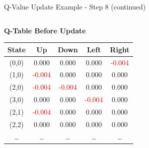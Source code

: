 \documentclass[aspectratio=169]{beamer}
\begin{document}
\begin{frame}{Q-Value Update Example - Step 8 (continued)}

    \begin{columns}
        
        \begin{column}{0.5\textwidth}
            \textbf{Q-Table Before Update}
            \small
            \begin{table}[h]
                \centering
                \begin{tabular}{|c|c|c|c|c|}
                    \hline
                    \textbf{State} & \textbf{Up} & \textbf{Down} & \textbf{Left} & \textbf{Right} \\
                    \hline
                    (0,0) & 0.000 & 0.000 & 0.000 & \textcolor{red}{-0.004} \\
                    (1,0) & \textcolor{red}{-0.004} & 0.000 & 0.000 & 0.000 \\
                    (2,0) & \textcolor{red}{-0.004} & \textcolor{red}{-0.004} & 0.000 & 0.000 \\
                    (3,0) & 0.000 & 0.000 & \textcolor{red}{-0.004} & 0.000 \\
                    (2,1) & \textcolor{red}{-0.004} & 0.000 & 0.000 & 0.000 \\
                    (2,2) & 0.000 & 0.000 & 0.000 & 0.000 \\
                    \dots & \dots & \dots & \dots & \dots \\
                    \hline
                \end{tabular}
            \end{table}
            
            \vspace{0.5cm}
            
\end{column}
\end{columns}
\end{frame}
\end{document}
